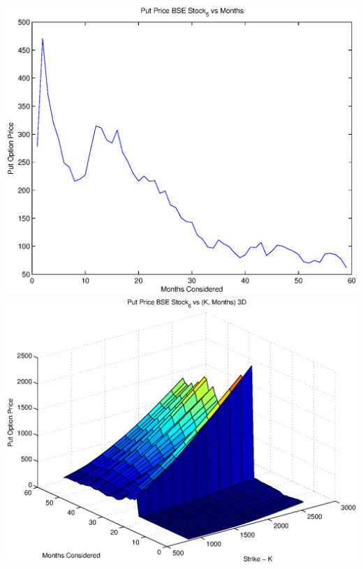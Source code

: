 \documentclass{article}
\begin{document}
\includegraphics[width=\textwidth]{Put_Price_BSE_Stock_5_vs_Months} \\

\includegraphics[width=\textwidth]{Put_Price_BSE_Stock_6_vs_(K,_Months)_3D} \\
\end{document}
